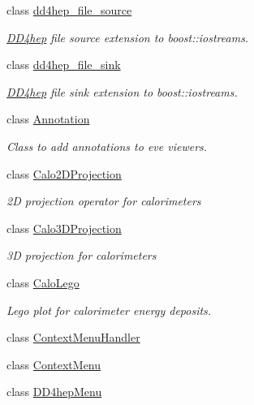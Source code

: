 \begin{DoxyCompactItemize}
class \hyperlink{class_d_d4hep_1_1dd4hep__file__source}{dd4hep\_\-file\_\-source}
\begin{DoxyCompactList}\small\item\em \hyperlink{namespace_d_d4hep}{DD4hep} file source extension to boost::iostreams. \item\end{DoxyCompactList}\item 
class \hyperlink{class_d_d4hep_1_1dd4hep__file__sink}{dd4hep\_\-file\_\-sink}
\begin{DoxyCompactList}\small\item\em \hyperlink{namespace_d_d4hep}{DD4hep} file sink extension to boost::iostreams. \item\end{DoxyCompactList}\item 
class \hyperlink{class_d_d4hep_1_1_annotation}{Annotation}
\begin{DoxyCompactList}\small\item\em Class to add annotations to eve viewers. \item\end{DoxyCompactList}\item 
class \hyperlink{class_d_d4hep_1_1_calo2_d_projection}{Calo2DProjection}
\begin{DoxyCompactList}\small\item\em 2D projection operator for calorimeters \item\end{DoxyCompactList}\item 
class \hyperlink{class_d_d4hep_1_1_calo3_d_projection}{Calo3DProjection}
\begin{DoxyCompactList}\small\item\em 3D projection for calorimeters \item\end{DoxyCompactList}\item 
class \hyperlink{class_d_d4hep_1_1_calo_lego}{CaloLego}
\begin{DoxyCompactList}\small\item\em Lego plot for calorimeter energy deposits. \item\end{DoxyCompactList}\item 
class \hyperlink{class_d_d4hep_1_1_context_menu_handler}{ContextMenuHandler}
\item 
class \hyperlink{class_d_d4hep_1_1_context_menu}{ContextMenu}
\item 
class \hyperlink{class_d_d4hep_1_1_d_d4hep_menu}{DD4hepMenu}

\end{DoxyCompactItemize}
